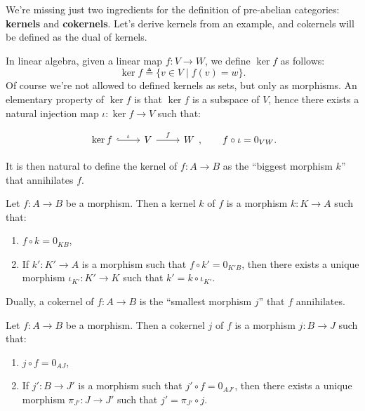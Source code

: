 \documentclass{beamer}
\begin{document}
\begin{frame}
    We're missing just two ingredients for the definition of pre-abelian categories:
    \textbf{kernels} and \textbf{cokernels}. Let's derive kernels from an example,
    and cokernels will be defined as the dual of kernels. \medskip
    
    
    In linear algebra, given a linear map $f : V \to W$, we define $\ker f$ as follows:
    \[
        \ker f \triangleq \{ v \in V \mid f(v) = w \}.
    \]
    Of course we're not allowed to defined kernels as sets, but only as morphisms.
    An elementary property of $\ker f$ is that $\ker f$ is a subspace of $V$, hence
    there exists a natural injection map $\iota : \ker f \to V$ such that:

    \[\begin{tikzcd}[ampersand replacement=\&]
        {\ker f} \& V \& W
        \arrow["\iota", hook, from=1-1, to=1-2]
        \arrow["f", from=1-2, to=1-3]
    \end{tikzcd}, \qquad f \circ \iota = 0_{VW}. \]
\end{frame}

\begin{frame}
    It is then natural to define the kernel of $f : A \to B$ as the ``biggest morphism $k$''
    that annihilates $f$. \medskip

    \begin{definition}
        Let $f : A \to B$ be a morphism. Then a kernel $k$ of $f$ is a morphism
        $k : K \to A$ such that:
        \begin{enumerate}
            \item $f \circ k = 0_{KB}$,
            \item If $k' : K' \to A$ is a morphism such that $f \circ k' = 0_{K'B}$, then
                there exists a unique morphism $\iota_{K'} : K' \to K$ such that
                $k' = k \circ \iota_{K'}$.
        \end{enumerate}
    \end{definition}
\end{frame}

\begin{frame}
    Dually, a cokernel of $f : A \to B$ is the ``smallest morphism $j$'' that
    $f$ annihilates. \medskip

    \begin{definition}
        Let $f : A \to B$ be a morphism. Then a cokernel $j$ of $f$ is a morphism
        $j : B \to J$ such that:
        \begin{enumerate}
            \item $j \circ f = 0_{AJ}$,
            \item If $j' : B \to J'$ is a morphism such that $j' \circ f = 0_{AJ'}$, then
                there exists a unique morphism $\pi_{J'} : J \to J'$ such that
                $j' = \pi_{J'} \circ j$.
        \end{enumerate}
    \end{definition}
\end{frame}
\end{document}
